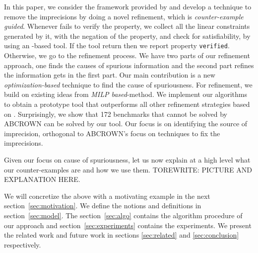 In this paper, we consider the framework provided by \deeppoly{} and develop a technique to remove the imprecisions by doing a novel refinement, which is \emph{counter-example guided}. Whenever \deeppoly{} fails to verify the property, we collect all the linear constraints generated by it, with the negation of the property, and check for satisfiability, by using an \milp{}-based tool.  If the tool return \unsat{} then we report property \texttt{verified}. Otherwise, we go to the refinement process. We have two parts of our refinement approach, one finds the causes of spurious information  and the second part refines the information gets in the first part.  Our main contribution is a new {\em optimization-based} technique to find the cause of spuriousness. For refinement, we build on existing ideas from {\em MILP based}-method. We implement our algorithms to obtain a prototype tool that outperforms all other refinement strategies based on \deeppoly{}. Surprisingly, we show that 172 benchmarks that cannot be solved by ABCROWN can be solved by our tool. Our focus is on identifying the source of imprecision, orthogonal to ABCROWN's focus on techniques to fix the imprecisions. %

Given our focus on cause of spuriousness, let us now explain at a high level what our counter-examples are and how we use them. TOREWRITE: PICTURE AND EXPLANATION HERE.







We will concretize the above with a motivating example in the next section~\ref{sec:motivation}.  We define the notions and definitions in section~\ref{sec:model}. The section~\ref{sec:algo} contains the 
algorithm procedure of our approach and section~\ref{sec:experiments} contains the experiments. 
We present the related work and future work in sections \ref{sec:related} and \ref{sec:conclusion} respectively. 




